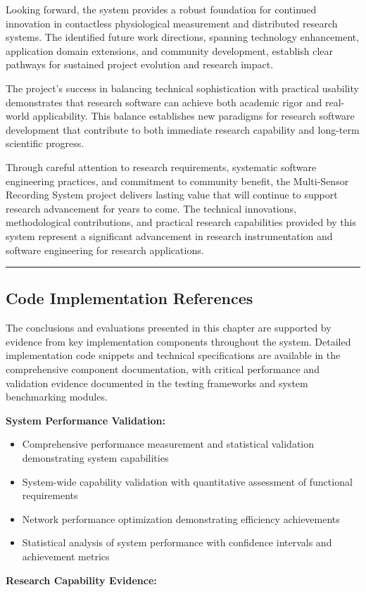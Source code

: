 \documentclass[11pt,a4paper]{article}
\begin{document}
Looking forward, the system provides a robust foundation for continued innovation in contactless physiological
measurement and distributed research systems. The identified future work directions, spanning technology enhancement,
application domain extensions, and community development, establish clear pathways for sustained project evolution and
research impact.

The project's success in balancing technical sophistication with practical usability demonstrates that research software
can achieve both academic rigor and real-world applicability. This balance establishes new paradigms for research
software development that contribute to both immediate research capability and long-term scientific progress.

Through careful attention to research requirements, systematic software engineering practices, and commitment to
community benefit, the Multi-Sensor Recording System project delivers lasting value that will continue to support
research advancement for years to come. The technical innovations, methodological contributions, and practical research
capabilities provided by this system represent a significant advancement in research instrumentation and software
engineering for research applications.

\hrule

\subsection{Code Implementation References}

The conclusions and evaluations presented in this chapter are supported by evidence from key implementation components
throughout the system. Detailed implementation code snippets and technical specifications are available in the
comprehensive component documentation, with critical performance and validation evidence documented in the testing
frameworks and system benchmarking modules.

\textbf{System Performance Validation:}

\begin{itemize}
\item Comprehensive performance measurement and statistical validation demonstrating system capabilities
\item System-wide capability validation with quantitative assessment of functional requirements
\item Network performance optimization demonstrating efficiency achievements
\item Statistical analysis of system performance with confidence intervals and achievement metrics

\end{itemize}
\textbf{Research Capability Evidence:}
\end{document}
